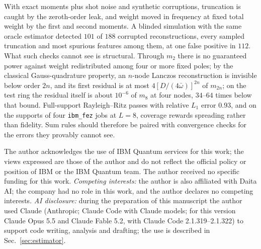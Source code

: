 \documentclass[aps,prb,reprint,onecolumn,12pt,superscriptaddress,longbibliography,floatfix]{revtex4-2}
\begin{document}
With exact moments plus shot noise and synthetic corruptions, truncation is caught by the zeroth-order leak, and weight moved in frequency at fixed total weight by the first and second moments. A blinded simulation with the same oracle estimator detected $101$ of $188$ corrupted reconstructions, every sampled truncation and most spurious features among them, at one false positive in $112$. What such checks cannot see is structural. Through $m_2$ there is no guaranteed power against weight redistributed among four or more fixed poles; by the classical Gauss-quadrature property, an $n$-node Lanczos reconstruction is invisible below order $2n$, and its first residual is at most $4[D/(4\bar\omega)]^{2n}$ of $m_{2n}$; on the test ring the residual itself is about $10^{-6}$ of $m_8$ at four nodes, $34$--$64$ times below that bound. Full-support Rayleigh--Ritz passes with relative $L_1$ error $0.93$, and on the supports of four \texttt{ibm\_fez} jobs at $L=8$, coverage rewards spreading rather than fidelity. Sum rules should therefore be paired with convergence checks for the errors they provably cannot see.

\begin{acknowledgments}
The author acknowledges the use of IBM Quantum services for this work; the views expressed are those of the author and do not reflect the official policy or position of IBM or the IBM Quantum team. The author received no specific funding for this work. \emph{Competing interests:} the author is also affiliated with Daita AI; the company had no role in this work, and the author declares no competing interests. \emph{AI disclosure:} during the preparation of this manuscript the author used Claude (Anthropic; Claude Code with Claude models; for this version Claude Opus 5.5 and Claude Fable 5.2, with Claude Code 2.1.319--2.1.322) to support code writing, analysis and drafting; the use is described in Sec.~\ref{sec:estimator}.
\end{acknowledgments}
\end{document}
